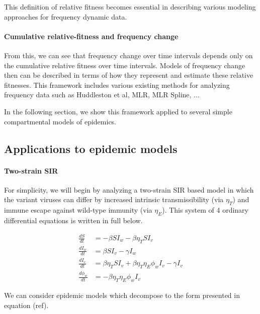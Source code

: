 \documentclass[12pt,oneside,letterpaper]{article}
\begin{document}
This definition of relative fitness becomes essential in describing various modeling approaches for frequency dynamic data.

\paragraph{Cumulative relative-fitness and frequency change}

From this, we can see that frequency change over time intervals depends only on the cumulative relative fitness over time intervals.
Models of frequency change then can be described in terms of how they represent and estimate these relative fitnesses.
This framework includes various existing methods for analyzing frequency data such as Huddleston et al, MLR, MLR Spline, ...

In the following section, we show this framework applied to several simple compartmental models of epidemics.

\subsection*{Applications to epidemic models}

\paragraph{Two-strain SIR}%

For simplicity, we will begin by analyzing a two-strain SIR based model in which the variant viruses can differ by increased intrinsic transmissibility (via $\eta_{T}$) and immune escape against wild-type immunity (via $\eta_{E}$).
This system of 4 ordinary differential equations is written in full below.

\begin{align*}
    \frac{d S}{d t} &= - \beta S I_{w} - \beta \eta_{T} S I_{v}\\ 
    \frac{d I_{w}}{dt} &= \beta S I_{v} - \gamma I_{w}\\
    \frac{d I_{v}}{dt} &= \beta \eta_{T} S I_{v} + \beta \eta_{T} \eta_{E} \phi_{w} I_{v} - \gamma I_{v}\\
    \frac{d \phi_{w}}{dt} &= - \beta \eta_{T} \eta_{E} \phi_{w} I_{v}
\end{align*}

We can consider epidemic models which decompose to the form presented in equation (ref).

\end{document}
